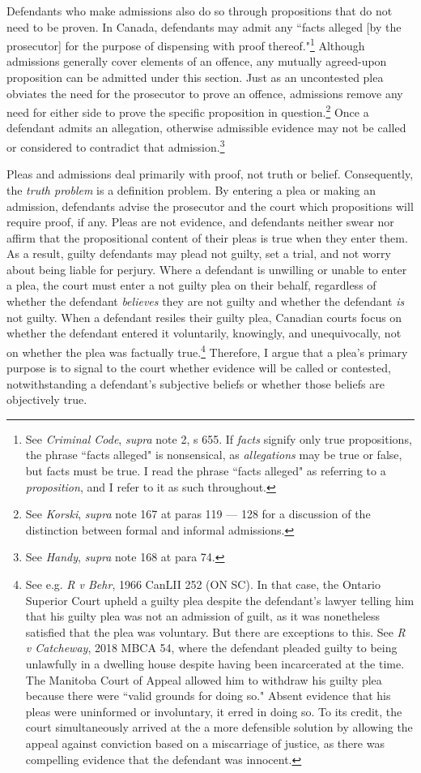 Defendants who make admissions also do so through propositions that do not need to be proven. In Canada, defendants may admit any ``facts alleged [by the prosecutor] for the purpose of dispensing with proof thereof."\footnote{See \textit{Criminal Code}, \textit{supra} note 2, s 655. If \textit{facts} signify only true propositions, the phrase ``facts alleged" is nonsensical, as \textit{allegations} may be true or false, but facts must be true. I read the phrase ``facts alleged" as referring to a \textit{proposition}, and I refer to it as such throughout.} Although admissions generally cover elements of an offence, any mutually agreed-upon proposition can be admitted under this section. Just as an uncontested plea obviates the need for the prosecutor to prove an offence, admissions remove any need for either side to prove the specific proposition in question.\footnote{See \textit{Korski}, \textit{supra} note 167 at paras 119 — 128 for a discussion of the distinction between formal and informal admissions.} Once a defendant admits an allegation, otherwise admissible evidence may not be called or considered to contradict that admission.\footnote{See \textit{Handy}, \textit{supra} note 168 at para 74.}

Pleas and admissions deal primarily with proof, not truth or belief. Consequently, the \textit{truth problem} is a definition problem. By entering a plea or making an admission, defendants advise the prosecutor and the court which propositions will require proof, if any. Pleas are not evidence, and defendants neither swear nor affirm that the propositional content of their pleas is true when they enter them. As a result, guilty defendants may plead not guilty, set a trial, and not worry about being liable for perjury. Where a defendant is unwilling or unable to enter a plea, the court must enter a not guilty plea on their behalf, regardless of whether the defendant \textit{believes} they are not guilty and whether the defendant \textit{is} not guilty. When a defendant resiles their guilty plea, Canadian courts focus on whether the defendant entered it voluntarily, knowingly, and unequivocally, not on whether the plea was factually true.\footnote{See e.g. \textit{R v Behr}, 1966 CanLII 252 (ON SC). In that case, the Ontario Superior Court upheld a guilty plea despite the defendant's lawyer telling him that his guilty plea was not an admission of guilt, as it was nonetheless satisfied that the plea was voluntary. But there are exceptions to this. See \textit{R v Catcheway}, 2018 MBCA 54, where the defendant pleaded guilty to being unlawfully in a dwelling house despite having been incarcerated at the time. The Manitoba Court of Appeal allowed him to withdraw his guilty plea because there were ``valid grounds for doing so." Absent evidence that his pleas were uninformed or involuntary, it erred in doing so. To its credit, the court simultaneously arrived at the a more defensible solution by allowing the appeal against conviction based on a miscarriage of justice, as there was compelling evidence that the defendant was innocent.} Therefore, I argue that a plea's primary purpose is to signal to the court whether evidence will be called or contested, notwithstanding a defendant's subjective beliefs or whether those beliefs are objectively true.


